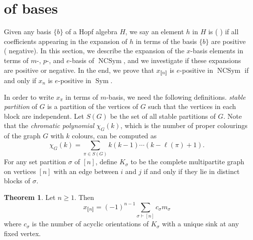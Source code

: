 \documentclass[12pt]{amsart}  %
\theoremstyle{definition}
\newtheorem{theorem}{Theorem}[section]
\theoremstyle{remark}
\numberwithin{equation}{section}
\newcommand{\Sym}{\ensuremath{\operatorname{Sym}}}
\newcommand{\NCSym}{\ensuremath{\operatorname{NCSym}}}
\newcommand{\mnc}{{m}}           	%
\newcommand{\xnc}{{x}}                 %
\newcommand{\stn}{{\llbracket n \rrbracket}}
\newcommand\svw[1]{{\color{black}{#1}}}
\begin{document}
\section{\svw{Changes} of bases}\label{sec:change} 
Given any basis $\{b\}$  of a Hopf algebra $H$, we say an element $h$ in $H$ is \svw{\emph{$b$-positive}} (\svw{respectively} \svw{\emph{$b$-negative}}) if all coefficients appearing in the expansion of $h$ in terms of the basis $\{b\}$ are positive (\svw{respectively} negative).
In this section, we describe the expansion of the $x$-basis elements in terms of \svw{the} $m$-, $p$-, and $e$-basis of $\NCSym$, and we investigate if these expansions are positive or negative. 
In the end, we 
prove that $x_{\stn}$ is $e$-positive in $\NCSym$ if and only if $x_n$ is $e$-positive in $\Sym$.

In order to write  $\xnc_\pi$ in terms of \svw{the} $\mnc$-basis, we need the following definitions. \svw{Given a graph $G$,
 a} \emph{stable partition} of $G$ is a partition of the vertices of $G$ such that the vertices in each block are independent. Let $S(G)$ be the set of all stable partitions of $G$.  Note that the \emph{chromatic polynomial} $\chi_G(k)$, which is the number of proper colourings of the graph $G$ with $k$ colours,  can be computed as 
\begin{equation}\label{eq:chi}\chi_G(k)=\sum_{\pi\in S(G)} k(k-1)\cdots (k-\ell(\pi)+1).\end{equation}
For any set partition $\sigma$ of $[n]$, define $K_\sigma$ to be the complete multipartite graph on vertices $[n]$ with an edge between $i$ and $j$ if and only if they lie in distinct blocks of $\sigma$.

\begin{theorem}\label{thm:x-to-m}
Let $n\geq 1$. Then 
$$\xnc_{\stn}=(-1)^{n-1}\sum_{\sigma\vdash [n]} c_\sigma \mnc_\sigma$$ where $c_\sigma$ is the number of acyclic orientations of $K_\sigma$ with a unique sink at any fixed vertex. 
\end{theorem}
\end{document}
